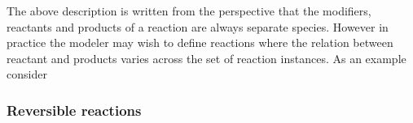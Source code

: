 \documentclass{cekarticle}
\begin{document}
The above description is written from the perspective that the modifiers, reactants and products of a
reaction are always separate species.  However in practice the modeler may wish to define reactions
where the relation between reactant and products varies across the set of reaction instances.
As an example consider 

\subsubsection{Reversible reactions}


%
%
%
%
%
%
%
%
\end{document}
